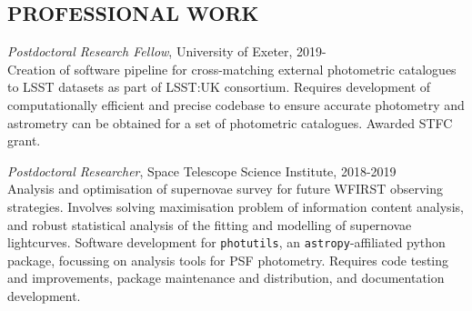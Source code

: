 \documentclass[letter, margin, 10pt]{res} %
\begin{document}
\begin{resume}

 



\section{PROFESSIONAL WORK}

{\sl Postdoctoral Research Fellow}, University of Exeter, 2019-\\
Creation of software pipeline for cross-matching external photometric catalogues to LSST datasets as part of LSST:UK consortium. Requires development of computationally efficient and precise codebase to ensure accurate photometry and astrometry can be obtained for a set of photometric catalogues. Awarded STFC grant.

{\sl Postdoctoral Researcher}, Space Telescope Science Institute, 2018-2019\\
Analysis and optimisation of supernovae survey for future WFIRST observing strategies. Involves solving maximisation problem of information content analysis, and robust statistical analysis of the fitting and modelling of supernovae lightcurves. Software development for \texttt{photutils}, an \texttt{astropy}-affiliated python package, focussing on analysis tools for PSF photometry. Requires code testing and improvements, package maintenance and distribution, and documentation development.


\end{resume}
\end{document}
